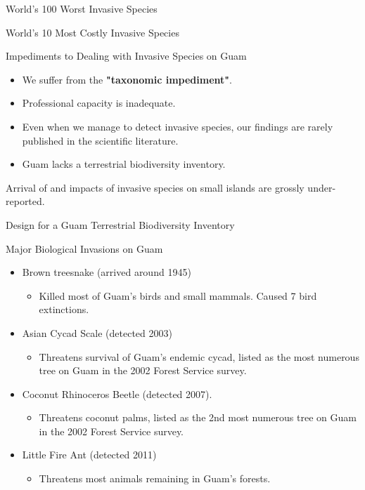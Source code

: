 \documentclass[]{beamer}
\begin{document}
\begin{frame}{World's 100 Worst Invasive Species}
\end{frame}

\begin{frame}{World's 10 Most Costly Invasive Species}
\end{frame}


\begin{frame}{Impediments to Dealing with Invasive Species on Guam}
	\begin{itemize}
		\item We suffer from the \textbf{"taxonomic impediment"}.
		\item Professional capacity is inadequate.
		\item Even when we manage to detect invasive species, our findings are rarely published in the scientific literature.
		\item Guam lacks a terrestrial biodiversity inventory. 
	\end{itemize}
	Arrival of and impacts of invasive species on small islands are grossly under-reported.
\end{frame}


\begin{frame}{Design for a Guam Terrestrial Biodiversity Inventory}
\end{frame}


\begin{frame}{Major Biological Invasions on Guam}
	\begin{itemize}
		\item Brown treesnake (arrived around 1945)
			\begin{itemize}
			\item Killed most of Guam's birds and small mammals. Caused 7 bird extinctions.
			\end{itemize}
		\item Asian Cycad Scale (detected 2003)
			\begin{itemize}
				\item Threatens survival of Guam's endemic cycad, listed as the most numerous tree on Guam in the 2002 Forest Service survey.
			\end{itemize}
		\item Coconut Rhinoceros Beetle (detected 2007). 
			\begin{itemize}
			\item Threatens coconut palms, listed as the 2nd most numerous tree on Guam in the 2002 Forest Service survey.
			\end{itemize}
		\item Little Fire Ant (detected 2011)
			\begin{itemize}
		\item Threatens most animals remaining in Guam's forests.
			\end{itemize}
	\end{itemize}		
\end{frame}
\end{document}
